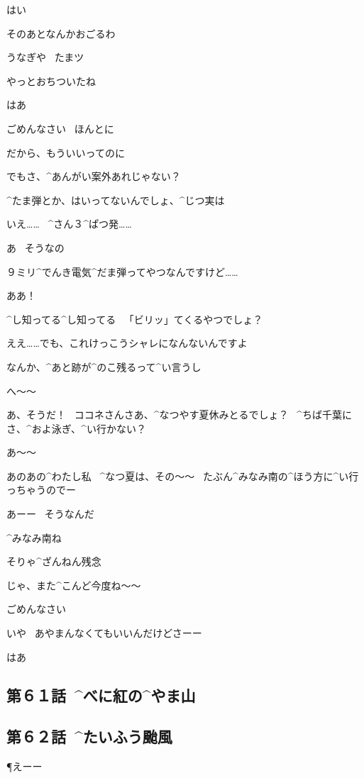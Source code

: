 \K はい

\R そのあとなんかおごるわ

\page
\Sign うなぎや
\ たまツ

\page
\R やっとおちついたね

\K はあ

\K ごめんなさい
\ ほんとに

\R だから、もういいってのに

\page
\R でもさ、^{あんがい}{案外}あれじゃない？

\R ^{たま}{弾}とか、はいってないんでしょ、^{じつ}{実}は

\K いえ……
\ ^{さん}{３}^{ぱつ}{発}……

\R あ
\ そうなの

\K ９ミリ^{でんき}{電気}^{だま}{弾}ってやつなんですけど……

\R ああ！

\R ^{し}{知}ってる^{し}{知}ってる
\ 「ビリッ」てくるやつでしょ？

\K ええ……でも、これけっこうシャレになんないんですよ

\K なんか、^{あと}{跡}が^{のこ}{残}るって^{い}{言}うし

\R へ〜〜

\page
\R あ、そうだ！
\ ココネさんさあ、^{なつやす}{夏休}みとるでしょ？
\ ^{ちば}{千葉}にさ、^{およ}{泳}ぎ、^{い}{行}かない？

\K あ〜〜

\K あのあの^{わたし}{私}
\ ^{なつ}{夏}は、その〜〜
\ たぶん^{みなみ}{南}の^{ほう}{方}に^{い}{行}っちゃうのでー

\R あーー
\ そうなんだ

\R ^{みなみ}{南}ね

\R そりゃ^{ざんねん}{残念}

\page
\R じゃ、また^{こんど}{今度}ね〜〜

\K ごめんなさい

\R いや
\ あやまんなくてもいいんだけどさーー

\K はあ


\subsection{第６１話\ ^{べに}{紅}の^{やま}{山}}


\subsection{第６２話\ ^{たいふう}{颱風}}

\page[98]
\P えーー

